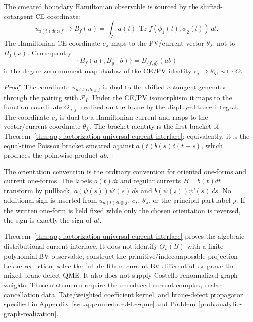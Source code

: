 \begin{cor}
\label{cor:app-factorization-source-of-B}
\label{prop:app-factorization-source-of-B}
  The smeared boundary Hamiltonian observable is sourced by the
  shifted-cotangent CE coordinate:
  \[
    u_{a(t)dt\otimes f}\longmapsto
    B_f(a)
      =\int_I a(t)\,
        \overline{\operatorname{Tr}
        f(\phi_1(t),\phi_2(t))}\,dt .
  \]
  The Hamiltonian CE coordinate \(c_\lambda\) maps to the PV/current
  vector \(\theta_\lambda\), not to \(B_f(a)\).  Consequently
  \[
    \{B_f(a),B_g(b)\}=B_{\{f,g\}}(ab)
  \]
  is the degree-zero moment-map shadow of the CE/PV identity
  \(c_\lambda\mapsto\theta_\lambda,\ u\mapsto O\).
\end{cor}

\begin{proof}
  The coordinate \(u_{a(t)dt\otimes f}\) is dual to the shifted
  cotangent generator through the pairing with
  \(\mathcal P_I\).  Under the CE/PV isomorphism it maps to the
  function coordinate \(O_{a,f}\), realized on the brane by the
  displayed trace integral.  The coordinate \(c_\lambda\) is dual to a
  Hamiltonian current and maps to the vector/current coordinate
  \(\theta_\lambda\).  The bracket identity is the first bracket of
  Theorem~\ref{thm:app-factorization-universal-current-interface};
  equivalently, it is the equal-time Poisson bracket smeared against
  \(a(t)b(s)\delta(t-s)\), which produces the pointwise product \(ab\).
\end{proof}

\begin{rmk}
\label{rmk:app-factorization-orientation-reversal}
  The orientation convention is the ordinary convention for oriented
  one-forms and current one-forms.  The labels \(a(t)dt\) and regular
  currents \(B=b(t)dt\) transform by pullback,
  \(a(\psi(s))\psi'(s)\,ds\) and \(b(\psi(s))\psi'(s)\,ds\).  No
  additional sign is inserted from
  \(u_{a(t)dt\otimes f}\), \(c_\lambda\), \(\theta_\lambda\), or the
  principal-part label \(\rho\).  If the written one-form is held fixed
  while only the chosen orientation is reversed, the sign is exactly the
  sign of \(dt\).
\end{rmk}

\begin{rmk}
\label{rmk:app-factorization-residual}
  Theorem~\ref{thm:app-factorization-universal-current-interface}
  proves the algebraic distributional-current interface.  It does not
  identify \(\Theta_\rho(B)\) with a finite polynomial BV observable,
  construct the primitive/indecomposable projection before reduction, solve
  the full de Rham-current BV differential, or prove the mixed
  brane-defect QME.  It also does not supply Costello renormalized
  graph weights.  Those statements require the unreduced current
  complex, scalar cancellation data, Tate/weighted coefficient kernel,
  and brane-defect propagator specified in
  Appendix~\ref{sec:app-unreduced-bv-qme} and
  Problem~\ref{prob:analytic-graph-realization}.
\end{rmk}

